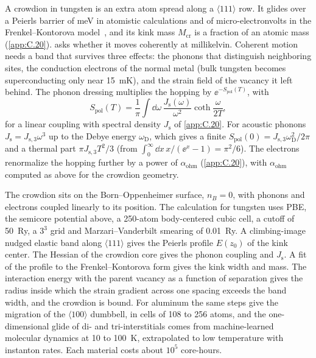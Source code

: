 A crowdion in tungsten is an extra atom spread along a $\langle111\rangle$ row. It glides over a Peierls barrier of meV in atomistic calculations and of micro-electronvolts in the Frenkel--Kontorova model~\cite{fitzgerald2018structure}, and its kink mass $M_{\mathrm{cr}}$ is a fraction of an atomic mass (\cref{app:C.20}).  asks whether it moves coherently at millikelvin. Coherent motion needs a band that survives three effects: the phonons that distinguish neighboring sites, the conduction electrons of the normal metal (bulk tungsten becomes superconducting only near \SI{15}{mK}), and the strain field of the vacancy it left behind. The phonon dressing multiplies the hopping by $\ee^{-S_{\mathrm{pol}}(T)}$, with
\begin{equation}
  S_{\mathrm{pol}}(T) = \frac{1}{\pi}\int\dd\omega\,\frac{J_{\mathrm{s}}(\omega)}{\omega^2}\coth\frac{\omega}{2T} ,
  \label{eq:E.22-Spol}
\end{equation}
for a linear coupling with spectral density $J_{\mathrm{s}}$ of \cref{app:C.20}. For acoustic phonons $J_{\mathrm{s}} = J_{\mathrm{s},3}\omega^3$ up to the Debye energy $\omega_{\mathrm{D}}$, which gives a finite $S_{\mathrm{pol}}(0) = J_{\mathrm{s},3}\omega_{\mathrm{D}}^2/2\pi$ and a thermal part $\pi J_{\mathrm{s},3}T^2/3$ (from $\int_0^\infty\dd x\,x/(\ee^x - 1) = \pi^2/6$). The electrons renormalize the hopping further by a power of $\alpha_{\mathrm{ohm}}$ (\cref{app:C.20}), with $\alpha_{\mathrm{ohm}}$ computed as above for the crowdion geometry.

The crowdion sits on the Born--Oppenheimer surface, $n_B = 0$, with phonons and electrons coupled linearly to its position. The calculation for tungsten uses PBE, the semicore potential above, a 250-atom body-centered cubic cell, a cutoff of \SI{50}{Ry}, a $3^3$ grid and Marzari--Vanderbilt smearing of \SI{0.01}{Ry}. A climbing-image nudged elastic band along $\langle111\rangle$ gives the Peierls profile $E(z_0)$ of the kink center. The Hessian of the crowdion core gives the phonon coupling and $J_{\mathrm{s}}$. A fit of the profile to the Frenkel--Kontorova form gives the kink width and mass. The interaction energy with the parent vacancy as a function of separation gives the radius inside which the strain gradient across one spacing exceeds the band width, and the crowdion is bound. For aluminum the same steps give the migration of the $\langle100\rangle$ dumbbell, in cells of 108 to 256 atoms, and the one-dimensional glide of di- and tri-interstitials comes from machine-learned molecular dynamics at 10 to \SI{100}{K}, extrapolated to low temperature with instanton rates. Each material costs about $10^5$ core-hours.

